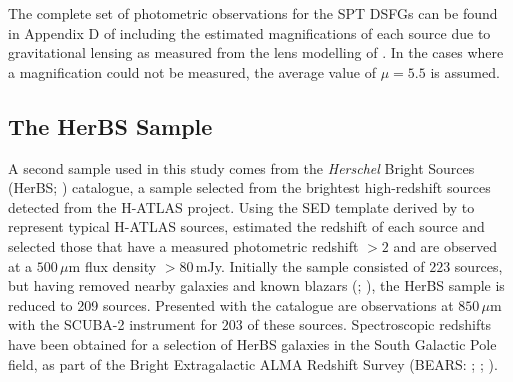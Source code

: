 The complete set of photometric observations for the SPT DSFGs can be found in Appendix D of \citealt{Reuter_2020} including the estimated magnifications of each source due to gravitational lensing as measured from the lens modelling of \citealt{Spilker_2016}. In the cases where a magnification could not be measured, the average value of $\mu = 5.5$ is assumed.

\subsection{The HerBS Sample}

A second sample used in this study comes from the \textit{Herschel} Bright Sources (HerBS; \citealt{Bakx_2018}) catalogue, a sample selected from the brightest high-redshift sources detected from the H-ATLAS project. Using the SED template derived by \citealt{Pearson_2013} to represent typical H-ATLAS sources, \citealt{Bakx_2018} estimated the redshift of each source and selected those that have a measured photometric redshift $> 2$ and are observed at a $500\,\mu$m flux density $> 80\,$mJy. Initially the sample consisted of $223$ sources, but having removed nearby galaxies and known blazars (\citealt{Negrello_2010}; \citealt{Lopez-Caniego_2013}), the HerBS sample is reduced to 209 sources. Presented with the catalogue are observations at $850\,\mu$m with the SCUBA-2 instrument for $203$ of these sources. Spectroscopic redshifts have been obtained for a selection of HerBS galaxies in the South Galactic Pole field, as part of the Bright Extragalactic ALMA Redshift Survey (BEARS: \citealt{Urquhart_2022}; \citealt{Bendo_2023}; \citealt{Hagimoto_2023}).

